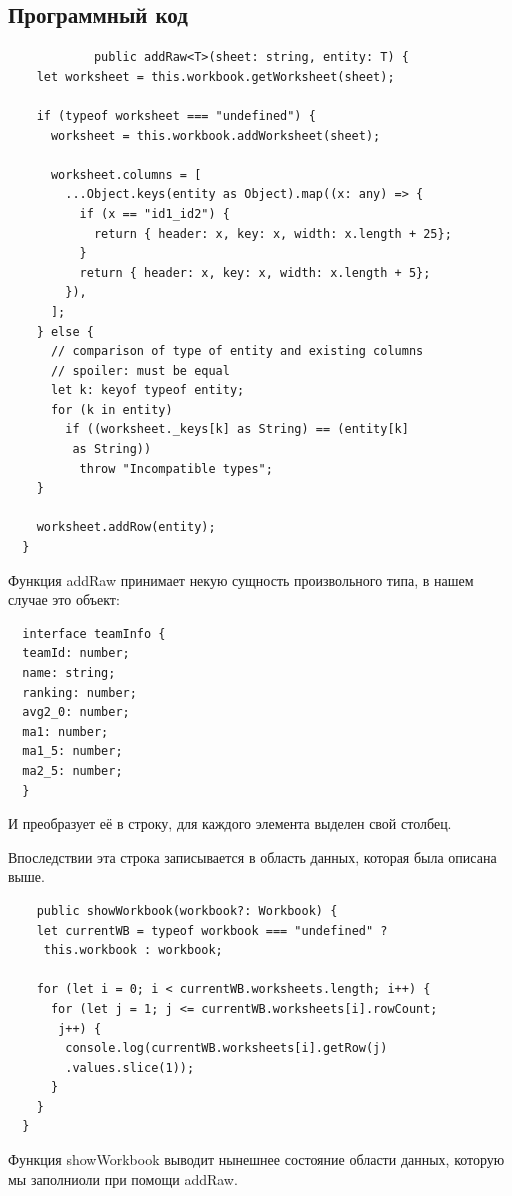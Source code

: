 \documentclass[utf8,14pt,a4paper,oneside,russian]{book}
\begin{document}
        \newpage
        \subsection{Программный код}
        \begin{lstlisting}
            public addRaw<T>(sheet: string, entity: T) {
    let worksheet = this.workbook.getWorksheet(sheet);

    if (typeof worksheet === "undefined") {
      worksheet = this.workbook.addWorksheet(sheet);

      worksheet.columns = [
        ...Object.keys(entity as Object).map((x: any) => {
          if (x == "id1_id2") {
            return { header: x, key: x, width: x.length + 25};
          }
          return { header: x, key: x, width: x.length + 5};
        }),
      ];
    } else {
      // comparison of type of entity and existing columns
      // spoiler: must be equal
      let k: keyof typeof entity;
      for (k in entity)
        if ((worksheet._keys[k] as String) == (entity[k]
         as String))
          throw "Incompatible types";
    }

    worksheet.addRow(entity);
  }
\end{lstlisting}

  Функция addRaw принимает некую сущность произвольного типа, в нашем случае это объект:
  
  \begin{lstlisting}
  interface teamInfo {
  teamId: number;
  name: string;
  ranking: number;
  avg2_0: number;
  ma1: number;
  ma1_5: number;
  ma2_5: number;
  }
\end{lstlisting}
И преобразует её в строку, для каждого элемента выделен свой столбец.

Впоследствии эта строка записывается в область данных, которая была описана выше.

\begin{lstlisting}
    public showWorkbook(workbook?: Workbook) {
    let currentWB = typeof workbook === "undefined" ?
     this.workbook : workbook;

    for (let i = 0; i < currentWB.worksheets.length; i++) {
      for (let j = 1; j <= currentWB.worksheets[i].rowCount;
       j++) {
        console.log(currentWB.worksheets[i].getRow(j)
        .values.slice(1));
      }
    }
  }
  \end{lstlisting}

  Функция showWorkbook выводит нынешнее состояние области данных, которую мы заполниоли при помощи addRaw.
\end{document}
